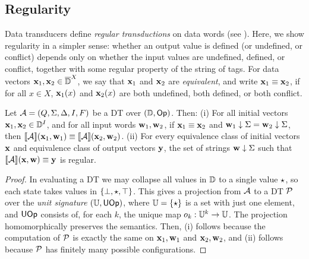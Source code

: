 \subsection{Regularity}
\label{dt:subsec:dt-regularity}
Data transducers define \emph{regular transductions} on data words (see ). Here, we show regularity in a simpler sense: whether an output value is defined (or undefined, or conflict) depends only on whether the input values are undefined, defined, or conflict, together with some regular property of the string of tags. For data vectors $\mathbf{x}_1, \mathbf{x}_2 \in {\overline{\mathbb{D}{}}}^X$, we say that $\mathbf{x}_1$ and $\mathbf{x}_2$ are \emph{equivalent}, and write $\mathbf{x}_1 \equiv \mathbf{x}_2$, if for all $x \in X$, $\mathbf{x}_1(x)$ and $\mathbf{x}_2(x)$ are both undefined, both defined, or both conflict.

\begin{theorem}
\label{dt:thm:regular-language}
Let $\mathcal{A} = (Q, \Sigma, \Delta, I, F)$ be a DT over $(\mathbb{D}, \textsf{Op})$. Then:
(i) For all initial vectors $\mathbf{x}_1, \mathbf{x}_2 \in \mathbb{D}^I$,
and for all input words $\mathbf{w}_1, \mathbf{w}_2$,
if $\mathbf{x}_1 \equiv \mathbf{x}_2$ and $\mathbf{w}_1 \downarrow \Sigma = \mathbf{w}_2 \downarrow \Sigma$,
then $\llbracket \mathcal{A} \rrbracket(\mathbf{x}_1,\mathbf{w}_1) \equiv \llbracket \mathcal{A} \rrbracket(\mathbf{x}_2,\mathbf{w}_2)$.
(ii) For every equivalence class of initial vectors $\mathbf{x}$ and equivalence class of output vectors $\mathbf{y}$, the set of strings $\mathbf{w} \downarrow \Sigma$ such that $\llbracket \mathcal{A} \rrbracket(\mathbf{x},\mathbf{w}) \equiv \mathbf{y}$ is regular.
\end{theorem}
\begin{proof}
In evaluating a DT we may collapse all values in $\mathbb{D}$ to a single
value $\star$, so each state takes values in $\{\bot, \star, \top\}$.
This gives a projection from $\mathcal{A}$ to a DT
$\mathcal{P}$ over the \emph{unit signature} $(\mathbb{U}, \textsf{UOp})$,
where $\mathbb{U} = \{\star\}$ is a set with just one element,
and $\textsf{UOp}$ consists of, for each $k$, the unique
map $o_k : \mathbb{U}^k \to \mathbb{U}$.
The projection homomorphically preserves the semantics.
Then, (i) follows because the computation of $\mathcal{P}$ is exactly the same
on $\mathbf{x}_1, \mathbf{w}_1$ and $\mathbf{x}_2, \mathbf{w}_2$, and (ii) follows because $\mathcal{P}$ has finitely many possible configurations.
\end{proof}

